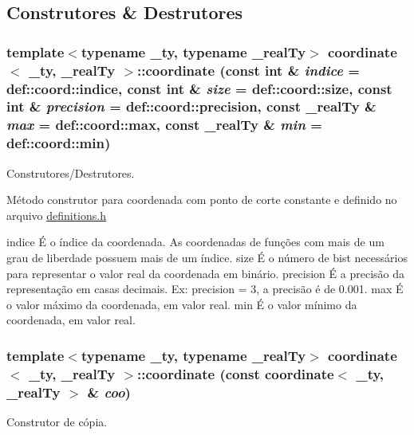 \subsection{Construtores \& Destrutores}
\hypertarget{classcoordinate_a1c690e9cfa9ce1bff5f1d64eaadd171f}{
\subsubsection[{coordinate}]{\setlength{\rightskip}{0pt plus 5cm}template$<$typename \_\-ty, typename \_\-realTy$>$ {\bf coordinate}$<$ \_\-ty, \_\-realTy $>$::{\bf coordinate} (const int \& {\em indice} = {\ttfamily def::coord::indice}, \/  const int \& {\em size} = {\ttfamily def::coord::size}, \/  const int \& {\em precision} = {\ttfamily def::coord::precision}, \/  const \_\-realTy \& {\em max} = {\ttfamily def::coord::max}, \/  const \_\-realTy \& {\em min} = {\ttfamily def::coord::min})}}
\label{classcoordinate_a1c690e9cfa9ce1bff5f1d64eaadd171f}


Construtores/Destrutores. 

Método construtor para coordenada com ponto de corte constante e definido no arquivo \hyperlink{definitions_8h}{definitions.h}

indice É o índice da coordenada. As coordenadas de funções com mais de um grau de liberdade possuem mais de um índice.  size É o número de bist necessários para representar o valor real da coordenada em binário.  precision É a precisão da representação em casas decimais. Ex: precision = 3, a precisão é de 0.001.  max É o valor máximo da coordenada, em valor real.  min É o valor mínimo da coordenada, em valor real. \hypertarget{classcoordinate_a52212c2723e16c95a8bc6acce3d6ef4e}{
\subsubsection[{coordinate}]{\setlength{\rightskip}{0pt plus 5cm}template$<$typename \_\-ty, typename \_\-realTy$>$ {\bf coordinate}$<$ \_\-ty, \_\-realTy $>$::{\bf coordinate} (const {\bf coordinate}$<$ \_\-ty, \_\-realTy $>$ \& {\em coo})}}
\label{classcoordinate_a52212c2723e16c95a8bc6acce3d6ef4e}
Construtor de cópia.

